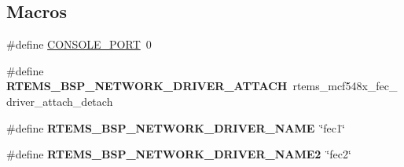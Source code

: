 \subsection*{Macros}
\begin{DoxyCompactItemize}
\item 
\#define \mbox{\hyperlink{group__RTEMSBSPsM68kGenMCF548X_ga0859abd84f64f7f09ad95a4079b06f41}{C\+O\+N\+S\+O\+L\+E\+\_\+\+P\+O\+RT}}~0
\item 
\mbox{\label{group__RTEMSBSPsM68kGenMCF548X_gadde0d66aef9442971dde465292ac14e6}} 
\#define {\bfseries R\+T\+E\+M\+S\+\_\+\+B\+S\+P\+\_\+\+N\+E\+T\+W\+O\+R\+K\+\_\+\+D\+R\+I\+V\+E\+R\+\_\+\+A\+T\+T\+A\+CH}~rtems\+\_\+mcf548x\+\_\+fec\+\_\+driver\+\_\+attach\+\_\+detach
\item 
\mbox{\label{group__RTEMSBSPsM68kGenMCF548X_ga86d4f9aa98431100692e31068070a8df}} 
\#define {\bfseries R\+T\+E\+M\+S\+\_\+\+B\+S\+P\+\_\+\+N\+E\+T\+W\+O\+R\+K\+\_\+\+D\+R\+I\+V\+E\+R\+\_\+\+N\+A\+ME}~\char`\"{}fec1\char`\"{}
\item 
\mbox{\label{group__RTEMSBSPsM68kGenMCF548X_ga9c7a480d4bd0eabe6766c4c6e24a340b}} 
\#define {\bfseries R\+T\+E\+M\+S\+\_\+\+B\+S\+P\+\_\+\+N\+E\+T\+W\+O\+R\+K\+\_\+\+D\+R\+I\+V\+E\+R\+\_\+\+N\+A\+M\+E2}~\char`\"{}fec2\char`\"{}
\end{DoxyCompactItemize}

